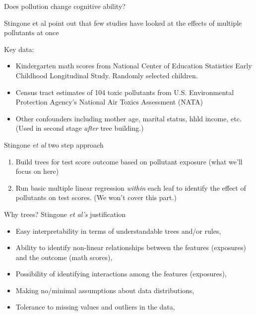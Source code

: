 \documentclass[mathserif, aspectratio=169]{beamer}
\begin{document}
\begin{frame}{Does pollution change cognitive ability?}

Stingone et al point out that few studies have looked at the effects of multiple pollutants at once

Key data:
\begin{itemize}
\item Kindergarten math scores from National Center of Education Statistics Early Childhood Longitudinal Study.  Randomly selected children.
\item Census tract estimates of 104 toxic pollutants from U.S. Environmental Protection Agency's National Air Toxics Assessment (NATA)
\item Other confounders including mother age, marital status, hhld income, etc.  (Used in second stage \textit{after} tree building.)
\end{itemize}

\end{frame}

\begin{frame}{Stingone \textit{et al} two step approach}

\begin{enumerate}
\item Build trees for test score outcome based on pollutant exposure (what we'll focus on here)
\item Run basic multiple linear regression \textit{within} each leaf to identify the effect of pollutants on test scores.  (We won't cover this part.)
\end{enumerate}
\end{frame}

\begin{frame}{Why trees?  Stingone \textit{et al's} justification}

\begin{itemize}
\item Easy interpretability in terms of understandable trees and/or rules, 
\item Ability to identify non-linear relationships between the features (exposures) and the outcome (math scores), 
\item Possibility of identifying interactions among the features (exposures), 
\item Making no/minimal assumptions about data distributions, 
\item Tolerance to missing values and outliers in the data, 
\end{itemize}
\end{frame}
\end{document}
